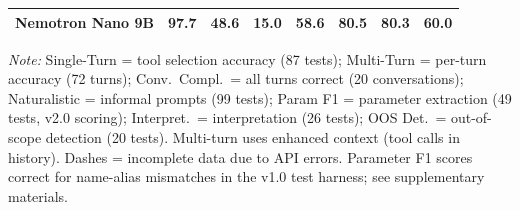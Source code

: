 \begin{table}[htbp]
\begin{threeparttable}
\begin{tabular}{@{}lrrrrrrr@{}}
Nemotron Nano 9B      &  97.7 & 48.6 & 15.0 & 58.6 & 80.5 & 80.3 & 60.0 \\
\bottomrule
\end{tabular}
\begin{tablenotes}[flushleft]
\item \emph{Note:} Single-Turn = tool selection accuracy (87 tests);
Multi-Turn = per-turn accuracy (72 turns); Conv.\ Compl.\ = all turns
correct (20 conversations); Naturalistic = informal prompts (99 tests);
Param F1 = parameter extraction (49 tests, v2.0 scoring);
Interpret.\ = interpretation
(26 tests); OOS Det.\ = out-of-scope detection (20 tests). Multi-turn
uses enhanced context (tool calls in history). Dashes = incomplete data
due to API errors. Parameter F1 scores correct for name-alias
mismatches in the v1.0 test harness; see supplementary materials.
\end{tablenotes}
\end{threeparttable}
\end{table}
